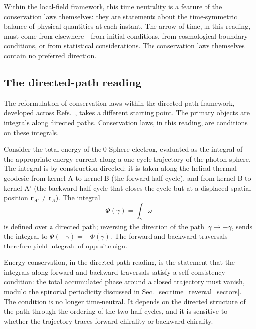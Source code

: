 \documentclass[%
 reprint, amsmath,amssymb, aps, prb, ]{revtex4-2}
\numberwithin{equation}{section}
\begin{document}
Within the local-field framework, this time neutrality is a feature of the conservation laws themselves: they are statements about the time-symmetric balance of physical quantities at each instant. The arrow of time, in this reading, must come from elsewhere---from initial conditions, from cosmological boundary conditions, or from statistical considerations. The conservation laws themselves contain no preferred direction.

\subsection{The directed-path reading}
\label{sec:directed_reading}

The reformulation of conservation laws within the directed-path framework, developed across Refs.~\cite{hanamura30, hanamura55}, takes a different starting point. The primary objects are integrals along directed paths. Conservation laws, in this reading, are conditions on these integrals.

Consider the total energy of the 0-Sphere electron, evaluated as the integral of the appropriate energy current along a one-cycle trajectory of the photon sphere. The integral is by construction directed: it is taken along the helical thermal geodesic from kernel A to kernel B (the forward half-cycle), and from kernel B to kernel A' (the backward half-cycle that closes the cycle but at a displaced spatial position $\mathbf{r}_{A'} \neq \mathbf{r}_A$). The integral
\begin{equation}
\Phi(\gamma) = \int_\gamma \omega
\label{eq:directed_integral}
\end{equation}
is defined over a directed path; reversing the direction of the path, $\gamma \to -\gamma$, sends the integral to $\Phi(-\gamma) = -\Phi(\gamma)$. The forward and backward traversals therefore yield integrals of opposite sign.

Energy conservation, in the directed-path reading, is the statement that the integrals along forward and backward traversals satisfy a self-consistency condition: the total accumulated phase around a closed trajectory must vanish, modulo the spinorial periodicity discussed in Sec.~\ref{sec:time_reversal_sectors}. The condition is no longer time-neutral. It depends on the directed structure of the path through the ordering of the two half-cycles, and it is sensitive to whether the trajectory traces forward chirality or backward chirality.
\end{document}
